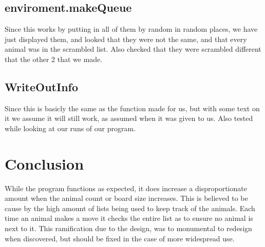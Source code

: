\documentclass{article}
\begin{document}
    \subsection{enviroment.makeQueue}
    Since this works by putting in all of them by random in random places, we have just displayed them, and looked that they were not the same, and that every animal was in the scrambled list. Also checked that they were scrambled different that the other 2 that we made.
    
    \subsection{WriteOutInfo}
    Since this is basicly the same as the function made for us, but with some text on it we assume it will still work, as assumed when it was given to us. Also tested while looking at our runs of our program.
    
    \section{Conclusion}
     While the program functions as expected, it does increase a disproportionate amount when the animal count or board size increases. This is believed to be cause by the high amount of lists being used to keep track of the animals. Each time an animal makes a move it checks the entire list as to ensure no animal is next to it. This ramification due to the design, was to monumental to redesign when discovered, but should be fixed in the case of more widespread use. 
\end{document}
